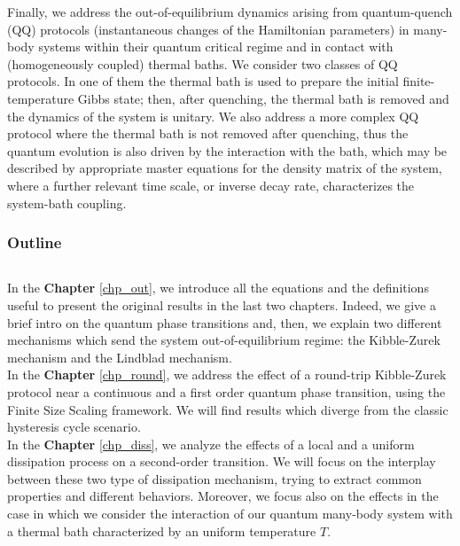 Finally, we address the out-of-equilibrium dynamics arising from quantum-quench (QQ) protocols 
(instantaneous changes of the Hamiltonian parameters) in many-body systems within their quantum
critical regime and in contact with (homogeneously coupled) thermal baths. We consider two classes
of QQ protocols. In one of them the thermal bath is used to prepare the initial finite-temperature
Gibbs state; then, after quenching, the thermal bath is removed and the dynamics of the system is
unitary. We also address a more complex QQ protocol where the thermal bath is not removed after
quenching, thus the quantum evolution is also driven by the interaction with the bath, which may
be described by appropriate master equations for the density matrix of the system, where a further
relevant time scale, or inverse decay rate, characterizes the system-bath coupling.


\subsubsection{Outline}
$ $

In the \textbf{Chapter} \ref{chp_out}, we introduce all the equations and the definitions
useful to present the original results in the last two chapters. Indeed, we give a brief
intro on the quantum phase transitions and, then, we explain two different mechanisms
which send the system out-of-equilibrium regime: the Kibble-Zurek mechanism and the
Lindblad mechanism.\\

In the \textbf{Chapter} \ref{chp_round}, we address the effect of a round-trip Kibble-Zurek
protocol near a continuous and a first order quantum phase transition, using the Finite Size Scaling 
framework. We will find results which diverge from the classic hysteresis cycle scenario.\\

In the \textbf{Chapter} \ref{chp_diss}, we analyze the effects of a local and a uniform
dissipation process on a second-order transition. We will focus on the interplay between
these two type of dissipation mechanism, trying to extract common properties and different
behaviors. Moreover, we focus also on the effects in the case in which we consider the
interaction of our quantum many-body system with a thermal bath characterized by an
uniform temperature $T$.
